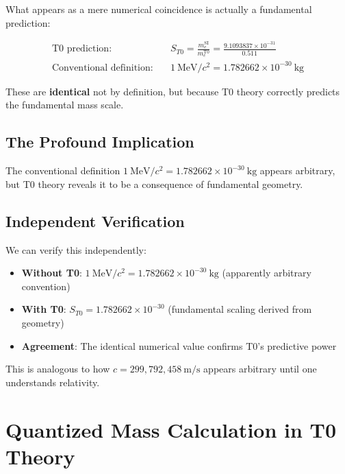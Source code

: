\documentclass[12pt,a4paper]{article}
\begin{document}
	What appears as a mere numerical coincidence is actually a fundamental prediction:
	
	\begin{align}
		\text{T0 prediction:} \quad & S_{T0} = \frac{m_e^{\mathrm{SI}}}{m_e^{\mathrm{T0}}} = \frac{9.1093837 \times 10^{-31}}{0.511} \\
		\text{Conventional definition:} \quad & 1~\mathrm{MeV}/c^2 = 1.782662 \times 10^{-30}~\mathrm{kg}
	\end{align}
	
	These are \textbf{identical} not by definition, but because T0 theory correctly predicts the fundamental mass scale.
	
	\subsection{The Profound Implication}
	
	\begin{center}
	\end{center}
	
	The conventional definition $1~\mathrm{MeV}/c^2 = 1.782662 \times 10^{-30}~\mathrm{kg}$ appears arbitrary, but T0 theory reveals it to be a consequence of fundamental geometry.
	
	\subsection{Independent Verification}
	
	We can verify this independently:
	
	\begin{itemize}
		\item \textbf{Without T0}: $1~\mathrm{MeV}/c^2 = 1.782662\times 10^{-30}~\mathrm{kg}$ (apparently arbitrary convention)
		\item \textbf{With T0}: $S_{T0} = 1.782662\times 10^{-30}$ (fundamental scaling derived from geometry)
		\item \textbf{Agreement}: The identical numerical value confirms T0's predictive power
	\end{itemize}
	
	This is analogous to how $c = 299,792,458~\mathrm{m/s}$ appears arbitrary until one understands relativity.
	
	\section{Quantized Mass Calculation in T0 Theory}
	
\end{document}
